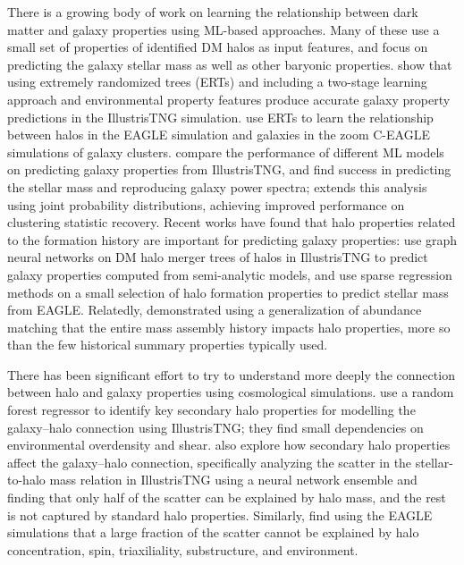 There is a growing body of work on learning the relationship between dark matter and galaxy properties using ML-based approaches.
Many of these use a small set of properties of identified DM halos as input features, and focus on predicting the galaxy stellar mass as well as other baryonic properties.
\cite{jo_machine-assisted_2019} show that using extremely randomized trees (ERTs) and including a two-stage learning approach and environmental property features produce accurate galaxy property predictions in the IllustrisTNG simulation.
\cite{lovell_machine_2021} use ERTs to learn the relationship between halos in the EAGLE simulation and galaxies in the zoom C-EAGLE simulations of galaxy clusters.
\cite{de_santi_mimicking_2021} compare the performance of different ML models on predicting galaxy properties from IllustrisTNG, and find success in predicting the stellar mass and reproducing galaxy power spectra; \cite{rodrigues_high-fidelity_2023} extends this analysis using joint probability distributions, achieving improved performance on clustering statistic recovery.
Recent works have found that halo properties related to the formation history are important for predicting galaxy properties: \cite{jespersen_learning_2022} use graph neural networks on DM halo merger trees of halos in IllustrisTNG to predict galaxy properties computed from semi-analytic models, and \cite{icaza-lizaola_sparse_2022} use sparse regression methods on a small selection of halo formation properties to predict stellar mass from EAGLE.
Relatedly, \cite{mendoza_multicam_2023} demonstrated using a generalization of abundance matching that the entire mass assembly history impacts halo properties, more so than the few historical summary properties typically used.

There has been significant effort to try to understand more deeply the connection between halo and galaxy properties using cosmological simulations.
\cite{delgado_modeling_2021} use a random forest regressor to identify key secondary halo properties for modelling the galaxy--halo connection using IllustrisTNG; they find small dependencies on environmental overdensity and shear.
\cite{stiskalek_scatter_2022} also explore how secondary halo properties affect the galaxy--halo connection, specifically analyzing the scatter in the stellar-to-halo mass relation in IllustrisTNG using a neural network ensemble and finding that only half of the scatter can be explained by halo mass, and the rest is not captured by standard halo properties.
Similarly, \cite{matthee_origin_2017} find using the EAGLE simulations that a large fraction of the scatter cannot be explained by halo concentration, spin, triaxiliality, substructure, and environment. 

